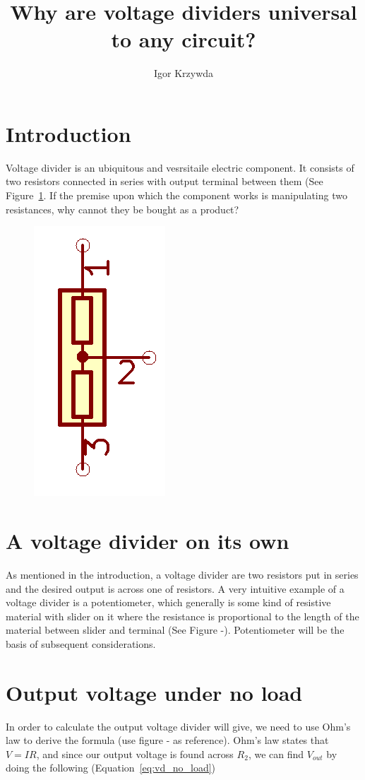 \documentclass{article}
\title{Why are voltage dividers universal to any circuit?}
\author{Igor Krzywda}
\begin{document}
\maketitle

\section{Introduction}

    Voltage divider is an ubiquitous and vesrsitaile electric component. 
    It consists of two resistors connected 
    in series with output terminal between them (See Figure~\ref{fig:divider_0}. 
    If the premise upon which the component works is manipulating two resistances,
    why cannot they be bought as a product? 

    \begin{figure}[H]
        \caption
        \centering
        \includegraphics[width=0.1\linewidth]{divider_0}
        \label{fig:divider_0}
    \end{figure}

\section{A voltage divider on its own}
    
    As mentioned in the introduction, a voltage divider are two resistors 
    put in series and the desired output is across one of resistors. A very 
    intuitive example of a voltage divider is a potentiometer, which generally
    is some kind of resistive material with slider on it where the resistance 
    is proportional to the length of the material between slider and terminal
    (See Figure -). Potentiometer will be the basis of subsequent considerations.

\section{Output voltage under no load}

    In order to calculate the output voltage divider will give, we need to 
    use Ohm's law to derive the formula (use figure - as reference). Ohm's 
    law states that $V = IR$, and since our output voltage is found across
    $R_2$, we can find $V_{out}$ by doing the following (Equation~\eqref{eq:vd_no_load})
\end{document}
